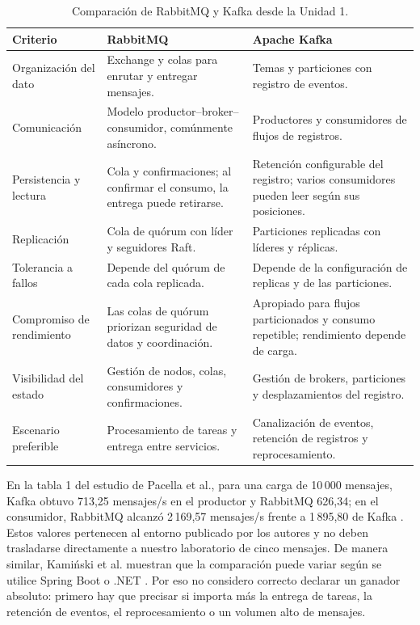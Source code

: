 \documentclass[12pt,a4paper]{article}
\begin{document}
\begin{table}[H]
\centering\footnotesize
\caption{Comparación de RabbitMQ y Kafka desde la Unidad 1.}
\begin{tabularx}{\linewidth}{@{}p{2.2cm}X X@{}}
\toprule
Criterio & RabbitMQ & Apache Kafka \\
\midrule
Organización del dato & Exchange y colas para enrutar y entregar mensajes. & Temas y particiones con registro de eventos. \\
Comunicación & Modelo productor--broker--consumidor, comúnmente asíncrono. & Productores y consumidores de flujos de registros. \\
Persistencia y lectura & Cola y confirmaciones; al confirmar el consumo, la entrega puede retirarse. & Retención configurable del registro; varios consumidores pueden leer según sus posiciones. \\
Replicación & Cola de quórum con líder y seguidores Raft. & Particiones replicadas con líderes y réplicas. \\
Tolerancia a fallos & Depende del quórum de cada cola replicada. & Depende de la configuración de replicas y de las particiones. \\
Compromiso de rendimiento & Las colas de quórum priorizan seguridad de datos y coordinación. & Apropiado para flujos particionados y consumo repetible; rendimiento depende de carga. \\
Visibilidad del estado & Gestión de nodos, colas, consumidores y confirmaciones. & Gestión de brokers, particiones y desplazamientos del registro. \\
Escenario preferible & Procesamiento de tareas y entrega entre servicios. & Canalización de eventos, retención de registros y reprocesamiento. \\
\bottomrule
\end{tabularx}
\end{table}

En la tabla 1 del estudio de Pacella et al., para una carga de 10\,000 mensajes, Kafka obtuvo 713,25 mensajes/s en el productor y RabbitMQ 626,34; en el consumidor, RabbitMQ alcanzó 2\,169,57 mensajes/s frente a 1\,895,80 de Kafka \cite{Pacella2025}. Estos valores pertenecen al entorno publicado por los autores y no deben trasladarse directamente a nuestro laboratorio de cinco mensajes. De manera similar, Kamiński et al. muestran que la comparación puede variar según se utilice Spring Boot o .NET \cite{Kaminski2025}. Por eso no considero correcto declarar un ganador absoluto: primero hay que precisar si importa más la entrega de tareas, la retención de eventos, el reprocesamiento o un volumen alto de mensajes.
\end{document}
